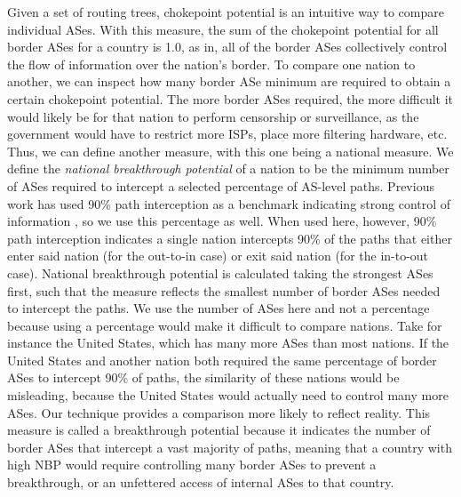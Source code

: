\par
Given a set of routing trees, chokepoint potential is an intuitive way to compare individual ASes. With this measure,
the sum of the chokepoint potential for all border ASes for a country is 1.0, as in, all of the border ASes collectively control the
flow of information over the nation's border. To compare one nation to another, we can inspect how many border ASe minimum are required
to obtain a certain chokepoint potential. The more border ASes required, the more difficult it would likely be for that nation to perform
censorship or surveillance, as the government would have to restrict more ISPs, place more filtering hardware, etc. Thus, we can define
another measure, with this one being a national measure. We define the \emph{national breakthrough potential} of a nation to be the minimum number
of ASes required to intercept a selected percentage of AS-level paths. Previous work has used 90\% path interception as a benchmark indicating strong control
of information \cite{throats}, so we use this percentage as well. When used here, however, 90\% path interception indicates a single nation intercepts 90\% of the paths
that either enter said nation (for the out-to-in case) or exit said nation (for the in-to-out case). National breakthrough potential is calculated taking the strongest ASes first,
such that the measure reflects the smallest number of border ASes needed to intercept the paths. We use the number of ASes here and not a percentage because using a percentage would
make it difficult to compare nations. Take for instance the United States, which has many more ASes than most nations. If the United States and another nation both required the same percentage
of border ASes to intercept 90\% of paths, the similarity of these nations would be misleading, because the United States would actually need to control many more ASes.
Our technique provides a comparison more likely to reflect reality. This measure is called a breakthrough potential because it indicates the number of border ASes that intercept a vast majority of paths, meaning that a country with high NBP would require controlling many border ASes to prevent a breakthrough, or an unfettered access of
internal ASes to that country.
